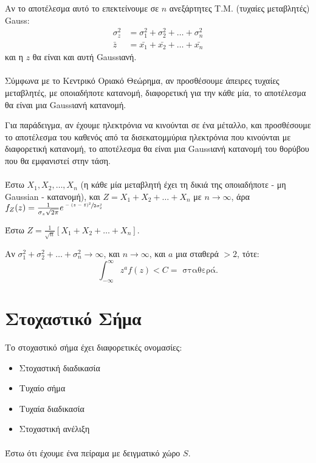 \documentclass[11pt,a4paper,notitlepage,fleqn,draft]{article}
\begin{document}
Αν το αποτέλεσμα αυτό το επεκτείνουμε σε \( n \) ανεξάρτητες Τ.Μ.
(τυχαίες μεταβλητές) Gauss:
\begin{align*}
	\sigma_z^2 &= \sigma_1^2+\sigma_2^2+\dots+\sigma_n^2 \\
	\bar z &= \bar{x_1} + \bar{x_2} + \dots + \bar{x_n}
\end{align*}
και η \( z \) θα είναι και αυτή Gaussιανή.

\paragraph{}
Σύμφωνα με το Κεντρικό Οριακό Θεώρημα, αν προσθέσουμε άπειρες τυχαίες
μεταβλητές, με οποιαδήποτε κατανομή, διαφορετική για την κάθε μία, το
αποτέλεσμα θα είναι μια Gaussιανή κατανομή.

Για παράδειγμα, αν έχουμε ηλεκτρόνια να κινούνται σε ένα μέταλλο, και
προσθέσουμε το αποτέλεσμα του καθενός από τα δισεκατομμύρια ηλεκτρόνια
που κινούνται με διαφορετική κατανομή, το αποτέλεσμα θα είναι μια
Gaussιανή κατανομή του θορύβου που θα εμφανιστεί στην τάση.

\paragraph{}
Έστω \( X_1,X_2,\dots,X_n \) (η κάθε μία μεταβλητή έχει τη δικιά της
οποιαδήποτε - μη Gaussian - κατανομή), και \( Z = X_1+X_2+\dots+X_n \) με
\( n\to \infty \), άρα \( f_Z(z)
= \frac{1}{\sigma_z\sqrt{2\pi}} e^{\sfrac{-(z-\bar z)^2}{2\sigma_2^2} }
\)

Έστω
\( Z = \frac{1}{\sqrt{n}} \left[X_1+X_2+\dots+X_n\right]\).

Αν \( \sigma_1^2+\sigma_2^2+\dots+\sigma_n^2 \to \infty \), και
\( n\to \infty \), και \( a \) μια σταθερά \( >2 \), τότε:
\[
\int_{-\infty}^{\infty} z^a f(z) < C = \text{ σταθερά.}
\]

\newpage
\section{Στοχαστικό Σήμα}
Το στοχαστικό σήμα έχει διαφορετικές ονομασίες:
\begin{itemize}
	\item Στοχαστική διαδικασία
	\item Τυχαίο σήμα
	\item Τυχαία διαδικασία
	\item Στοχαστική ανέλιξη
\end{itemize}

\paragraph{}
Έστω ότι έχουμε ένα πείραμα με δειγματικό χώρο \( S \).
\end{document}
